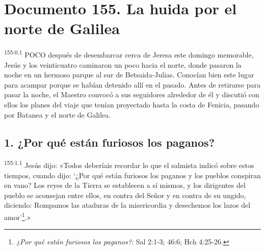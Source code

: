 \chapter{Documento 155. La huida por el norte de Galilea}
\par
\textsuperscript{155:0.1} POCO después de desembarcar cerca de Jeresa este domingo memorable, Jesús y los veinticuatro caminaron un poco hacia el norte, donde pasaron la noche en un hermoso parque al sur de Betsaida-Julias. Conocían bien este lugar para acampar porque se habían detenido allí en el pasado. Antes de retirarse para pasar la noche, el Maestro convocó a sus seguidores alrededor de él y discutió con ellos los planes del viaje que tenían proyectado hasta la costa de Fenicia, pasando por Batanea y el norte de Galilea.

\section*{1. ¿Por qué están furiosos los paganos?}
\par
\textsuperscript{155:1.1} Jesús dijo: «Todos deberíais recordar lo que el salmista indicó sobre estos tiempos, cuando dijo: `¿Por qué están furiosos los paganos y los pueblos conspiran en vano? Los reyes de la Tierra se establecen a sí mismos, y los dirigentes del pueblo se aconsejan entre ellos, en contra del Señor y en contra de su ungido, diciendo: Rompamos las ataduras de la misericordia y desechemos los lazos del amor'\footnote{\textit{¿Por qué están furiosos los paganos?}: Sal 2:1-3; 46:6; Hch 4:25-26.}.»


